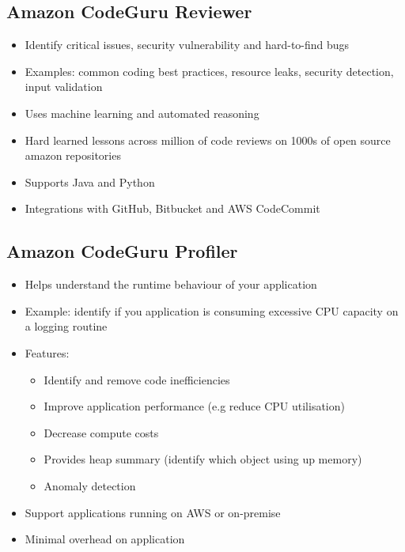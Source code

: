 
\subsection{Amazon CodeGuru Reviewer}
\begin{itemize}
    \item Identify critical issues, security vulnerability and hard-to-find bugs
    \item Examples: common coding best practices, resource leaks, security detection, input validation
    \item Uses machine learning and automated reasoning
    \item Hard learned lessons across million of code reviews on 1000s of open source amazon repositories
    \item Supports Java and Python
    \item Integrations with GitHub, Bitbucket and AWS CodeCommit
\end{itemize}

\subsection{Amazon CodeGuru Profiler}
\begin{itemize}
    \item Helps understand the runtime behaviour of your application
    \item Example: identify if you application is consuming excessive CPU capacity on a logging routine
    \item Features:
    \begin{itemize}
        \item Identify and remove code inefficiencies
        \item Improve application performance (e.g reduce CPU utilisation)
        \item Decrease compute costs
        \item Provides heap summary (identify which object using up memory)
        \item Anomaly detection
    \end{itemize}
    \item Support applications running on AWS or on-premise
    \item Minimal overhead on application
\end{itemize}


